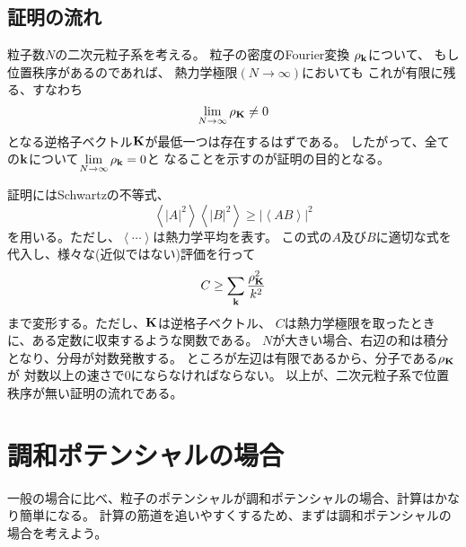 \documentclass{jarticle}
\renewcommand{\v}[1]{{\bf #1}}
\newcommand{\ave}[1]{\left< #1 \right>}
\begin{document}
\subsection{証明の流れ}

粒子数$N$の二次元粒子系を考える。
粒子の密度のFourier変換 $\rho_{\bf k}$について、
もし位置秩序があるのであれば、
熱力学極限$(N \rightarrow \infty)$においても
これが有限に残る、すなわち
\begin{equation}
  \lim_{N \rightarrow \infty} \rho_{\bf K} \ne 0
\end{equation}
となる逆格子ベクトル${\bf K}$が最低一つは存在するはずである。
したがって、全ての${\bf k}$について$\displaystyle \lim_{N \rightarrow \infty} \rho_{\bf k} = 0$と
なることを示すのが証明の目的となる。

証明にはSchwartzの不等式、
\begin{equation}
  \ave{|A|^2}\ave{|B|^2} \ge |\ave{A B}|^2
\end{equation}
を用いる。ただし、$\ave{\cdots}$は熱力学平均を表す。
この式の$A$及び$B$に適切な式を代入し、様々な(近似ではない)評価を行って
\begin{equation}
  C \ge \sum_{\v{k}} \frac{\rho_{\bf K}^2}{k^2}
\end{equation}
まで変形する。ただし、$\bf{K}$は逆格子ベクトル、
$C$は熱力学極限を取ったときに、ある定数に収束するような関数である。
$N$が大きい場合、右辺の和は積分となり、分母が対数発散する。
ところが左辺は有限であるから、分子である$\rho_{\bf K}$が
対数以上の速さで0にならなければならない。
以上が、二次元粒子系で位置秩序が無い証明の流れである。

\section{調和ポテンシャルの場合}

一般の場合に比べ、粒子のポテンシャルが調和ポテンシャルの場合、計算はかなり簡単になる。
計算の筋道を追いやすくするため、まずは調和ポテンシャルの場合を考えよう\cite{Jancovici}。
\end{document}
